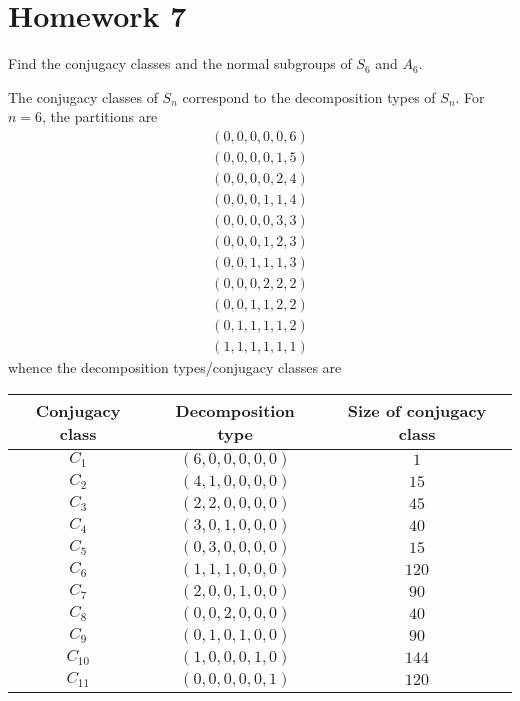 \section*{Homework 7}

\begin{exercise}
Find the conjugacy classes and the normal subgroups of \(S_6\) and \(A_6\).
\end{exercise}
\begin{solution}
The conjugacy classes of \(S_n\) correspond to the decomposition types of \(S_n\). For \(n = 6\), the partitions are
\begin{gather*}
    (0, 0, 0, 0, 0, 6) \\
    (0, 0, 0, 0, 1, 5) \\
    (0, 0, 0, 0, 2, 4) \\
    (0, 0, 0, 1, 1, 4) \\
    (0, 0, 0, 0, 3, 3) \\
    (0, 0, 0, 1, 2, 3) \\
    (0, 0, 1, 1, 1, 3) \\
    (0, 0, 0, 2, 2, 2) \\
    (0, 0, 1, 1, 2, 2) \\
    (0, 1, 1, 1, 1, 2) \\
    (1, 1, 1, 1, 1, 1)
\end{gather*}
whence the decomposition types/conjugacy classes are
\begin{center}
    \begin{tabular}{c|c|c}
        Conjugacy class & Decomposition type & Size of conjugacy class \\
        \hline
        \(C_{1}\) & \((6, 0, 0, 0, 0, 0)\) & \(1\) \\
        \(C_{2}\) & \((4, 1, 0, 0, 0, 0)\) & \(15\) \\
        \(C_{3}\) & \((2, 2, 0, 0, 0, 0)\) & \(45\) \\
        \(C_{4}\) & \((3, 0, 1, 0, 0, 0)\) & \(40\) \\
        \(C_{5}\) & \((0, 3, 0, 0, 0, 0)\) & \(15\) \\
        \(C_{6}\) & \((1, 1, 1, 0, 0, 0)\) & \(120\) \\
        \(C_{7}\) & \((2, 0, 0, 1, 0, 0)\) & \(90\) \\
        \(C_{8}\) & \((0, 0, 2, 0, 0, 0)\) & \(40\) \\
        \(C_{9}\) & \((0, 1, 0, 1, 0, 0)\) & \(90\) \\
        \(C_{10}\) & \((1, 0, 0, 0, 1, 0)\) & \(144\) \\
        \(C_{11}\) & \((0, 0, 0, 0, 0, 1)\) & \(120\)
    \end{tabular}
\end{center}


\end{solution}
